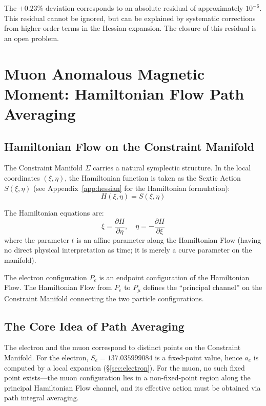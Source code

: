 \documentclass[aps,prd,reprint,nofootinbib]{revtex4-2}
\begin{document}
The $+0.23\%$ deviation corresponds to an absolute residual of approximately $10^{-6}$. This residual cannot be ignored, but can be explained by systematic corrections from higher-order terms in the Hessian expansion. The closure of this residual is an open problem.

\section{Muon Anomalous Magnetic Moment: Hamiltonian Flow Path Averaging}
\label{sec:muon}

\subsection{Hamiltonian Flow on the Constraint Manifold}

The Constraint Manifold $\Sigma$ carries a natural symplectic structure. In the local coordinates $(\xi, \eta)$, the Hamiltonian function is taken as the Sextic Action $S(\xi, \eta)$ (see Appendix~\ref{app:hessian} for the Hamiltonian formulation):
\begin{equation}
H(\xi, \eta) = S(\xi, \eta) \label{eq:hamiltonian}
\end{equation}

The Hamiltonian equations are:
\begin{equation}
\dot{\xi} = \frac{\partial H}{\partial \eta}, \quad \dot{\eta} = -\frac{\partial H}{\partial \xi} \label{eq:ham_eq}
\end{equation}
where the parameter $t$ is an affine parameter along the Hamiltonian Flow (having no direct physical interpretation as time; it is merely a curve parameter on the manifold).

The electron configuration $P_e$ is an endpoint configuration of the Hamiltonian Flow. The Hamiltonian Flow from $P_e$ to $P_\mu$ defines the ``principal channel'' on the Constraint Manifold connecting the two particle configurations.

\subsection{The Core Idea of Path Averaging}

The electron and the muon correspond to distinct points on the Constraint Manifold. For the electron, $S_e = 137.035999084$ is a fixed-point value, hence $a_e$ is computed by a local expansion (\S\ref{sec:electron}). For the muon, no such fixed point exists---the muon configuration lies in a non-fixed-point region along the principal Hamiltonian Flow channel, and its effective action must be obtained via path integral averaging.
\end{document}

